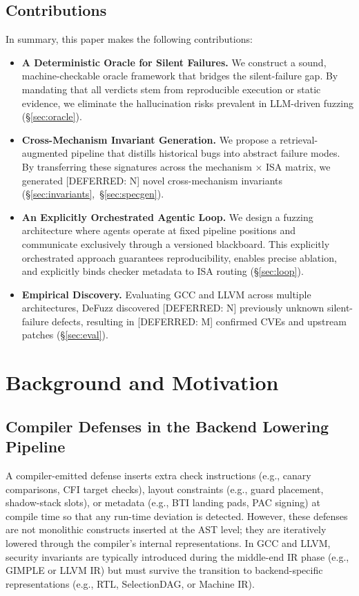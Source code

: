 \documentclass[conference]{IEEEtran}
\begin{document}
\subsection{Contributions}
In summary, this paper makes the following contributions:
\begin{itemize}
  \item \textbf{A Deterministic Oracle for Silent Failures.} We construct a sound, machine-checkable oracle framework that bridges the silent-failure gap. By mandating that all verdicts stem from reproducible execution or static evidence, we eliminate the hallucination risks prevalent in LLM-driven fuzzing (\S\ref{sec:oracle}).
  \item \textbf{Cross-Mechanism Invariant Generation.} We propose a retrieval-augmented pipeline that distills historical bugs into abstract failure modes. By transferring these signatures across the mechanism $\times$ ISA matrix, we generated [DEFERRED: N] novel cross-mechanism invariants (\S\ref{sec:invariants},~\S\ref{sec:specgen}).
  \item \textbf{An Explicitly Orchestrated Agentic Loop.} We design a fuzzing architecture where agents operate at fixed pipeline positions and communicate exclusively through a versioned blackboard. This explicitly orchestrated approach guarantees reproducibility, enables precise ablation, and explicitly binds checker metadata to ISA routing (\S\ref{sec:loop}).
  \item \textbf{Empirical Discovery.} Evaluating GCC and LLVM across multiple architectures, DeFuzz discovered [DEFERRED: N] previously unknown silent-failure defects, resulting in [DEFERRED: M] confirmed CVEs and upstream patches (\S\ref{sec:eval}).
\end{itemize}

\section{Background and Motivation}\label{sec:bg}

\subsection{Compiler Defenses in the Backend Lowering Pipeline}
A compiler-emitted defense inserts extra check instructions (e.g., canary comparisons, CFI target checks), layout constraints (e.g., guard placement, shadow-stack slots), or metadata (e.g., BTI landing pads, PAC signing) at compile time so that any run-time deviation is detected. However, these defenses are not monolithic constructs inserted at the AST level; they are iteratively lowered through the compiler's internal representations. In GCC and LLVM, security invariants are typically introduced during the middle-end IR phase (e.g., GIMPLE or LLVM IR) but must survive the transition to backend-specific representations (e.g., RTL, SelectionDAG, or Machine IR).
\end{document}
